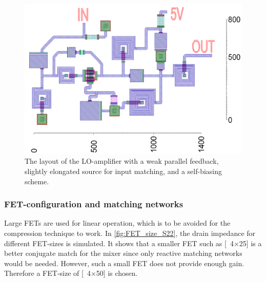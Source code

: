 			\begin{figure}[hbt!]
				\centering
				\includegraphics[width=1.0\textwidth]{fig/amplifiers/lo/layout}
				\caption[LO-amplifier layout]{The layout of the LO-amplifier with a weak parallel feedback, slightly elongated source for input matching, and a self-biasing scheme.\scalemum}\label{fig:lo_layout}
			\end{figure}



		\subsubsection{FET-configuration and matching networks}\label{sec:lo_fet_config}
			Large FETs are used for linear operation, which is to be avoided for the compression technique to work.\autocite{maas98} In \autoref{fig:FET_size_S22}, the drain impedance for different FET-sizes is simulated. It shows that a smaller FET such as \unit[4$\times$25]{\mum} is a better conjugate match for the mixer since only reactive matching networks would be needed. However, such a small FET does not provide enough gain. Therefore a FET-size of \unit[4$\times$50]{\mum} is chosen.


